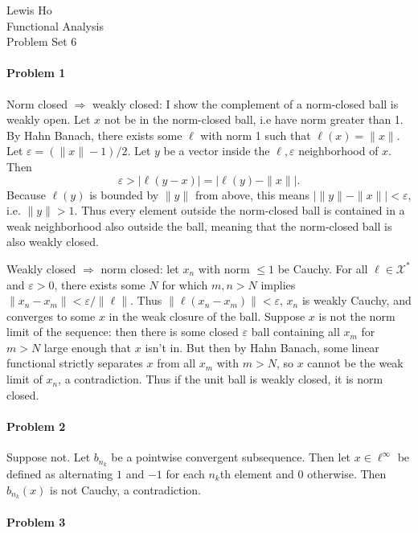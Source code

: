 \documentclass[12pt]{article}
\newcommand{\X}{\mathcal{X}}
\begin{document}
\begin{center}
  Lewis Ho\\
  Functional Analysis\\
  Problem Set 6
\end{center}

\paragraph{Problem 1}

Norm closed $\Rightarrow$ weakly closed: I show the complement of a norm-closed
ball is weakly open. Let $x$ not be in the norm-closed ball, i.e have norm
greater than 1. By Hahn Banach, there
exists some $\ell$ with norm 1 such that $\ell(x) = \|x\|$. Let $\varepsilon =
(\|x\|-1)/2$. Let $y$ be a vector inside the $\ell, \varepsilon$ neighborhood
of $x$. Then
\begin{displaymath}
  \varepsilon > |\ell(y-x)| = |\ell(y) - \|x\||.
\end{displaymath}
Because $\ell(y)$ is bounded by $\|y\|$ from above, this means $|\|y\|-\|x\||<
\varepsilon$, i.e. $\|y\| > 1$. Thus every element outside the norm-closed ball
is contained in a weak neighborhood also outside the ball, meaning that the
norm-closed ball is also weakly closed.

Weakly closed $\Rightarrow$ norm closed: let $x_n$ with norm $\leq 1$ be Cauchy.
For all $\ell \in \X^*$ and $\varepsilon > 0$, there exists some $N$ for which
$m,n > N$ implies $\|x_n-x_m\| < \varepsilon/\|\ell\|$. Thus $\|\ell(x_n-x_m)\|
<\varepsilon$, $x_n$ is weakly Cauchy, and converges to some $x$ in the weak
closure of the ball. Suppose $x$ is not the norm limit of the sequence: then
there is some closed $\varepsilon$ ball containing all $x_m$ for $m>N$ large
enough that $x$ isn't in. But then by Hahn Banach, some linear functional
strictly separates $x$ from all $x_m$ with $m>N$, so $x$ cannot be the weak limit
of $x_n$, a contradiction. Thus if the unit ball is weakly closed, it is norm
closed.

\paragraph{Problem 2}

Suppose not. Let $b_{n_k}$ be a pointwise convergent subsequence. Then let $x\in
\ell^\infty$ be defined as alternating $1$ and $-1$ for each $n_k$th element and
0 otherwise. Then $b_{n_k}(x)$ is not Cauchy, a contradiction.

\paragraph{Problem 3}
\end{document}
